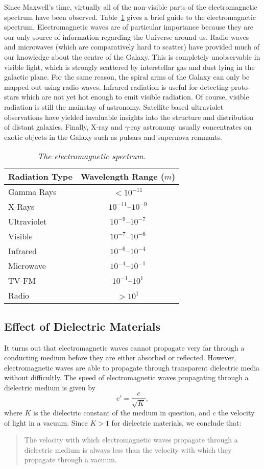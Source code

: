 Since Maxwell's time, virtually all of the
non-visible parts of the electromagnetic spectrum have been observed. 
Table~\ref{t11.1}  gives a brief guide to the electromagnetic spectrum. 
Electromagnetic waves are of particular importance because they 
are our only source of information regarding the Universe around us. 
Radio waves and microwaves (which are comparatively
hard to scatter) have provided much of
our knowledge about the centre of the Galaxy. This is completely unobservable
in visible light, which is strongly scattered by interstellar gas and dust
lying in the galactic plane. 
For the same reason, the spiral arms of the Galaxy can only be mapped out using radio waves.
Infrared radiation is useful for detecting 
proto-stars which are not yet hot enough to emit visible radiation.
Of course, visible radiation is still the mainstay of astronomy. 
Satellite based ultraviolet observations have yielded invaluable insights into
the structure and distribution of distant galaxies. Finally, X-ray and $\gamma$-ray
astronomy usually concentrates on  exotic objects in the Galaxy such as pulsars
and supernova remnants. 
\begin{table}
\centering
\begin{tabular}{|l|c|}\hline
Radiation Type& Wavelength Range ($m$)\\[0.5ex]\hline
Gamma Rays & $<10^{-11}$ \\[0.5ex]
X-Rays & $10^{-11}$--$10^{-9}$ \\[0.5ex]
Ultraviolet & $10^{-9}$--$10^{-7}$\\[0.5ex]
Visible & $10^{-7}$--$10^{-6}$\\[0.5ex]
Infrared& $10^{-6}$--$10^{-4}$\\[0.5ex]
Microwave & $10^{-4}$--$10^{-1}$\\[0.5ex]
TV-FM & $10^{-1}$--$10^1$ \\[0.5ex]
Radio& $>10^1$\\\hline
\end{tabular}
\caption{\em The electromagnetic spectrum.}\label{t11.1}
\end{table}

\subsection{Effect of Dielectric Materials}\label{s11.3}
It turns out that electromagnetic waves cannot propagate very far through
a conducting medium before they are either absorbed or reflected. However,
electromagnetic waves are able to propagate through transparent dielectric media
without difficultly. The speed of electromagnetic waves propagating through
a dielectric medium is given by
\begin{equation}
c' = \frac{c}{\sqrt{K}},
\end{equation}
where $K$ is the dielectric constant of the medium in question, and
$c$  the velocity of light in a vacuum. Since $K>1$ for dielectric
materials, we conclude that:
\begin{quote}
{\sf The  velocity with which  electromagnetic
waves propagate 
through a dielectric medium is always less than the velocity
with which they propagate through a  vacuum. }
\end{quote}

